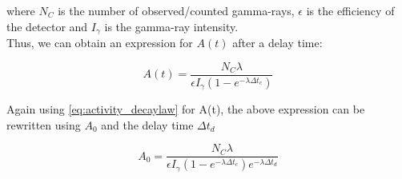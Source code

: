 \documentclass[a4paper,11pt,twoside]{book}
\begin{document}
where $N_C$ is the number of observed/counted gamma-rays, $\epsilon$ is the efficiency of the detector and $I_\gamma$ is the gamma-ray intensity.\\ 

\noindent
Thus, we can obtain an expression for $A(t)$ after a delay time: 

\begin{equation} \label{eq:Final_Expression_A}
    A(t) = \frac{N_C \lambda}{\epsilon I_\gamma (1-e^{-\lambda \Delta t_c})}
\end{equation}

\noindent 
Again using \ref{eq:activity_decaylaw} for A(t), the above expression can be rewritten using $A_0$ and the delay time $\Delta t_d$

\begin{equation} \label{eq:Final_Expression_A0}
    A_0 = \frac{N_C \lambda }{\epsilon I_\gamma (1-e^{-\lambda \Delta t_c})e^{-\lambda \Delta t_d}}
\end{equation}

\end{document}
